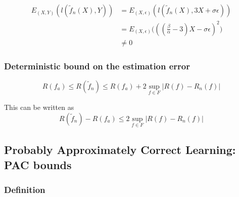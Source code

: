 \documentclass[
10pt, %
a4paper, %
oneside, %
headinclude,footinclude, %
BCOR5mm, %
]{scrartcl}
\begin{document}
    \begin{equation*}
        \begin{aligned}
            \label{eq:}
	    E_{(X,Y)}(l( \tilde{f}_n(X), Y))&=E_{(X,\epsilon)}(l( \tilde{f}_n(X), 3X+\sigma\epsilon))\\
            &=E_{(X,\epsilon)}\big(( (\frac{\beta}{\alpha} - 3)X-\sigma\epsilon)^2\big)\\
            &\neq 0
        \end{aligned}
    \end{equation*}


    \subsubsection{\large\color{Periwinkle}Deterministic bound on the estimation error}

    \begin{proposition}
	\label{prop:dilemma}
	\begin{equation*}
	    R(f_a)\leq R( \tilde{f}_n)\leq R(f_a)+2 \sup_{f\in F}|R(f)- R_n(f)|
	\end{equation*}
    \end{proposition}

    \begin{remark}
        
	This can be written as
	\begin{equation*}
	    R( \tilde{f}_n)- R(f_a)\leq 2 \sup_{f\in F}|R(f)- R_n(f)|
	\end{equation*}
    \end{remark}

\subsection{\large\color{MidnightBlue}Probably Approximately Correct Learning: PAC bounds}

\subsubsection{\large\color{Periwinkle}Definition}
\end{document}
